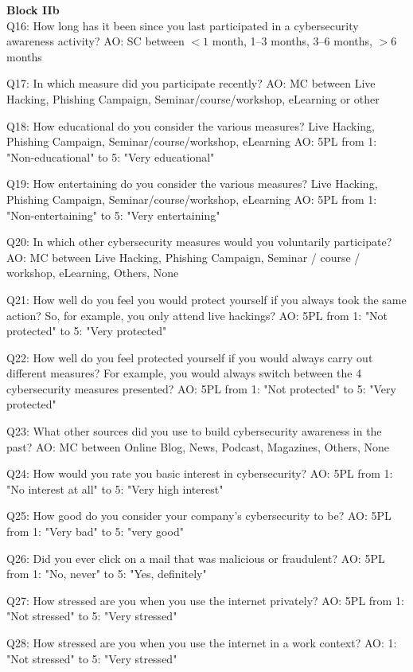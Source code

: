 \textbf{Block IIb}\\
Q16: How long has it been since you last participated in a cybersecurity awareness activity? AO: SC between $<1$ month, 1--3 months, 3--6 months, $>6$ months

Q17: In which measure did you participate recently? AO: MC between Live Hacking, Phishing Campaign, Seminar/course/workshop, eLearning or other

Q18: How educational do you consider the various measures? Live Hacking, Phishing Campaign, Seminar/course/workshop, eLearning AO: 5PL from 1: "Non-educational" to 5: "Very educational"

Q19: How entertaining do you consider the various measures? Live Hacking, Phishing Campaign, Seminar/course/workshop, eLearning AO: 5PL from 1: "Non-entertaining" to 5: "Very entertaining"

Q20: In which other cybersecurity measures would you voluntarily participate? AO: MC between Live Hacking, Phishing Campaign, Seminar / course / workshop, eLearning, Others, None

Q21: How well do you feel you would protect yourself if you always took the same action? So, for example, you only attend live hackings? AO: 5PL from 1: "Not protected" to 5: "Very protected"

Q22: How well do you feel protected yourself if you would always carry out different measures? For example, you would always switch between the 4 cybersecurity measures presented?  AO: 5PL from 1: "Not protected" to 5: "Very protected"

Q23: What other sources did you use to build cybersecurity awareness in the past? AO: MC between Online Blog, News, Podcast, Magazines, Others, None

Q24:  How would you rate you basic interest in cybersecurity? AO: 5PL from 1: "No interest at all" to 5: "Very high interest"

Q25: How good do you consider your company's cybersecurity to be? AO: 5PL from 1: "Very bad" to 5: "very good"

Q26: Did you ever click on a mail that was malicious or fraudulent? AO: 5PL from 1: "No, never" to 5: "Yes, definitely"

Q27: How stressed are you when you use the internet privately? AO: 5PL from 1: "Not stressed" to 5: "Very stressed"

Q28: How stressed are you when you use the internet in a work context? AO: 1: "Not stressed" to 5: "Very stressed"

